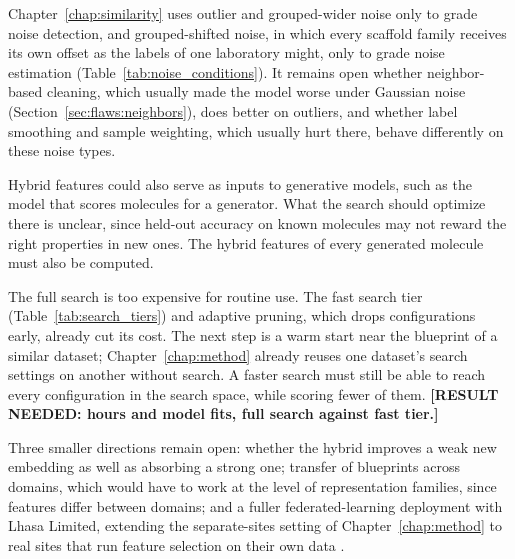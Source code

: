 Chapter~\ref{chap:similarity} uses outlier and grouped-wider noise only to grade noise detection, and grouped-shifted noise, in which every scaffold family receives its own offset as the labels of one laboratory might, only to grade noise estimation (Table~\ref{tab:noise_conditions}). It remains open whether neighbor-based cleaning, which usually made the model worse under Gaussian noise (Section~\ref{sec:flaws:neighbors}), does better on outliers, and whether label smoothing and sample weighting, which usually hurt there, behave differently on these noise types.

Hybrid features could also serve as inputs to generative models, such as the model that scores molecules for a generator. What the search should optimize there is unclear, since held-out accuracy on known molecules may not reward the right properties in new ones. The hybrid features of every generated molecule must also be computed.

The full search is too expensive for routine use. The fast search tier (Table~\ref{tab:search_tiers}) and adaptive pruning, which drops configurations early, already cut its cost. The next step is a warm start near the blueprint of a similar dataset; Chapter~\ref{chap:method} already reuses one dataset's search settings on another without search. A faster search must still be able to reach every configuration in the search space, while scoring fewer of them. \textbf{[RESULT NEEDED: hours and model fits, full search against fast tier.]}

Three smaller directions remain open: whether the hybrid improves a weak new embedding as well as absorbing a strong one; transfer of blueprints across domains, which would have to work at the level of representation families, since features differ between domains; and a fuller federated-learning deployment with Lhasa Limited, extending the separate-sites setting of Chapter~\ref{chap:method} to real sites that run feature selection on their own data \citep{McMahan2017}.


